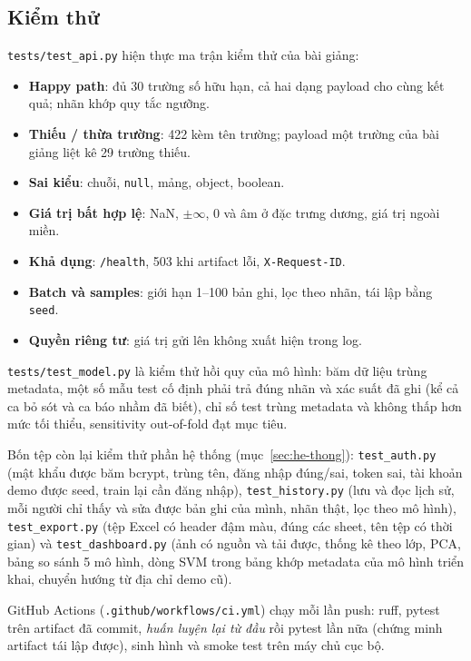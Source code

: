 \documentclass[12pt]{article}
\begin{document}
\subsection{Kiểm thử}
\label{sec:kiem-thu}
\texttt{tests/test\_api.py} hiện thực ma trận kiểm thử của bài giảng:
\begin{itemize}
  \item \textbf{Happy path}: đủ 30 trường số hữu hạn, cả hai dạng payload cho cùng kết quả; nhãn khớp quy tắc ngưỡng.
  \item \textbf{Thiếu / thừa trường}: 422 kèm tên trường; payload một trường của bài giảng liệt kê 29 trường thiếu.
  \item \textbf{Sai kiểu}: chuỗi, \texttt{null}, mảng, object, boolean.
  \item \textbf{Giá trị bất hợp lệ}: NaN, $\pm\infty$, 0 và âm ở đặc trưng dương, giá trị ngoài miền.
  \item \textbf{Khả dụng}: \texttt{/health}, 503 khi artifact lỗi, \texttt{X-Request-ID}.
  \item \textbf{Batch và samples}: giới hạn 1--100 bản ghi, lọc theo nhãn, tái lập bằng \texttt{seed}.
  \item \textbf{Quyền riêng tư}: giá trị gửi lên không xuất hiện trong log.
\end{itemize}
\texttt{tests/test\_model.py} là kiểm thử hồi quy của mô hình: băm dữ liệu trùng metadata, một số mẫu test cố định
phải trả đúng nhãn và xác suất đã ghi (kể cả ca bỏ sót và ca báo nhầm đã biết), chỉ số test trùng metadata và không
thấp hơn mức tối thiểu, sensitivity out-of-fold đạt mục tiêu.

Bốn tệp còn lại kiểm thử phần hệ thống (mục~\ref{sec:he-thong}): \texttt{test\_auth.py} (mật khẩu được băm bcrypt, trùng
tên, đăng nhập đúng/sai, token sai, tài khoản demo được seed, train lại cần đăng nhập), \texttt{test\_history.py} (lưu
và đọc lịch sử, mỗi người chỉ thấy và sửa được bản ghi của mình, nhãn thật, lọc theo mô hình),
\texttt{test\_export.py} (tệp Excel có header đậm màu, đúng các sheet, tên tệp có thời gian) và
\texttt{test\_dashboard.py} (ảnh có nguồn và tải được, thống kê theo lớp, PCA, bảng so sánh 5 mô hình, dòng SVM trong
bảng khớp metadata của mô hình triển khai, chuyển hướng từ địa chỉ demo cũ).

GitHub Actions (\texttt{.github/workflows/ci.yml}) chạy mỗi lần push: ruff, pytest trên artifact đã commit,
\emph{huấn luyện lại từ đầu} rồi pytest lần nữa (chứng minh artifact tái lập được), sinh hình và smoke test trên
máy chủ cục bộ.
\end{document}
